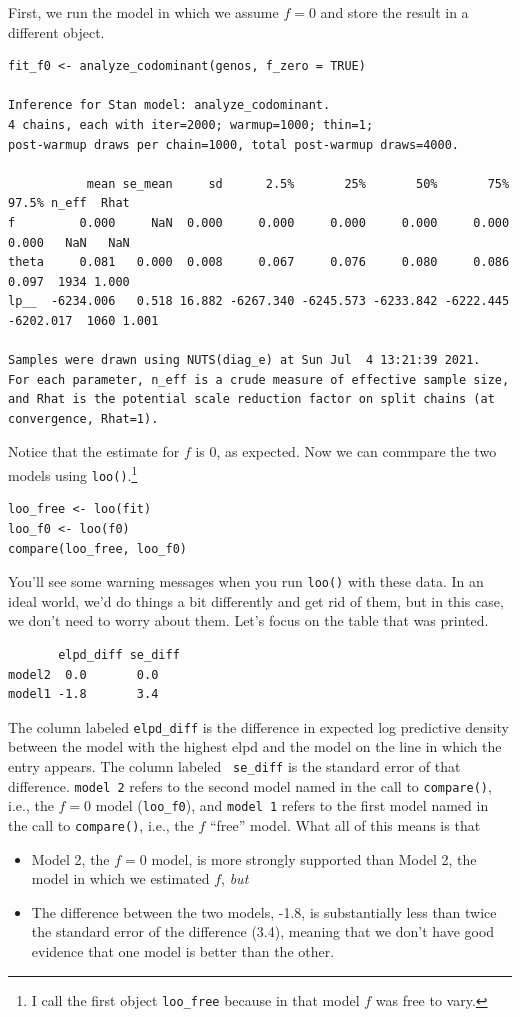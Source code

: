\documentclass[12pt]{article}
\begin{document}
First, we run the model in which we assume $f = 0$ and store the
result in a different object.
\begin{verbatim}
fit_f0 <- analyze_codominant(genos, f_zero = TRUE)

Inference for Stan model: analyze_codominant.
4 chains, each with iter=2000; warmup=1000; thin=1; 
post-warmup draws per chain=1000, total post-warmup draws=4000.

           mean se_mean     sd      2.5%       25%       50%       75%     97.5% n_eff  Rhat
f         0.000     NaN  0.000     0.000     0.000     0.000     0.000     0.000   NaN   NaN
theta     0.081   0.000  0.008     0.067     0.076     0.080     0.086     0.097  1934 1.000
lp__  -6234.006   0.518 16.882 -6267.340 -6245.573 -6233.842 -6222.445 -6202.017  1060 1.001

Samples were drawn using NUTS(diag_e) at Sun Jul  4 13:21:39 2021.
For each parameter, n_eff is a crude measure of effective sample size,
and Rhat is the potential scale reduction factor on split chains (at 
convergence, Rhat=1).
\end{verbatim}
Notice that the estimate for $f$ is 0, as expected. Now we can
commpare the two models using {\tt loo()}.\footnote{I call the first
  object {\tt loo\_free} because in that model $f$ was free to vary.}
\begin{verbatim}
loo_free <- loo(fit)
loo_f0 <- loo(f0)
compare(loo_free, loo_f0)
\end{verbatim}
You'll see some warning messages when you run {\tt loo()} with these
data. In an ideal world, we'd do things a bit differently and get rid
of them, but in this case, we don't need to worry about them. Let's
focus on the table that was printed.
\begin{verbatim}
       elpd_diff se_diff
model2  0.0       0.0   
model1 -1.8       3.4   
\end{verbatim}
The column labeled {\tt elpd\_diff} is the difference in expected log
predictive density between the model with the highest elpd and the
model on the line in which the entry appears. The column labeled {\tt
  se\_diff} is the standard error of that difference. {\tt model 2}
refers to the second model named in the call to {\tt compare()}, i.e.,
the $f=0$ model ({\tt loo\_f0}), and {\tt model 1} refers to the first
model named in the call to {\tt compare()}, i.e., the $f$ ``free''
model. What all of this means is that

\begin{itemize}

  \item Model 2, the $f=0$ model, is more strongly supported than
    Model 2, the model in which we estimated $f$, {\it but}

  \item The difference between the two models, -1.8, is substantially
    less than twice the standard error of the difference (3.4),
    meaning that we don't have good evidence that one model is better
    than the other.
    
\end{itemize}
\end{document}
